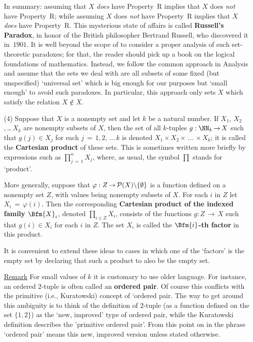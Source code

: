 {    In summary: assuming that $X$ {\em does} have Property~R implies that $X$ does {\em not} have Property~R;
    while assuming $X$ does {\em not} have Property~R implies that $X$ {\em does} have Property~R.
        This mysterious state of affairs is called {\bf Russell's Paradox},
    in honor of the British philosopher Bertrand Russell, who discovered it in~$1901$.
    It is well beyond the scope of {\TheseNotes} to consider a proper analysis of such set-theoretic paradoxes;
    for that, the reader should pick up a book on the logical foundations of mathematics.
    Instead, we follow the common approach in Analysis and assume that the sets we deal with are all subsets of some fixed (but unspecified) `universal set' which is big enough for our purposes but `small enough' to avoid such paradoxes.
    In particular, this approach only sets $X$ which satisfy the relation $X \not \in X$.

\VV


        (4) Suppose that $X$ is a nonempty set and let $k$ be a natural number. If $X_{1}$, $X_{2}$,\,{\ldots}\,$X_{k}$ are nonempty subsets of $X$,
    then the set of all $k$-tuples $g:{\NN}_{k} \,{\rightarrow}\, X$ such that $g(j){\in}X_{j}$ for each $j \,=\, 1,2,\,{\ldots}\,k$ is denoted $X_{1}{\times}X_{2}{\times}\,{\ldots}\,{\times}X_{k}$; it is called the {\bf Cartesian product} of these sets.
    This is sometimes written more briefly by expressions such as ${\prod}_{j \,=\, 1}^{n} X_{j}$, where, as usual, the symbol $\prod$ stands for `product'.

        More generally, suppose that ${\varphi}:Z \,{\rightarrow}\, {\cal P}(X){\setminus}\{{\emptyset}\}$ is a function defined on a nonempty set $Z$, 
    with values being nonempty subsets of $X$.
    For each $i$ in $Z$ let $X_{i} \,=\, {\varphi}(i)$.
    Then the corresponding {\bf Cartesian product of the indexed family $\Bfm{X}_{i}$}, denoted ${\prod}_{i{\in}Z} X_{i}$,
    consists of the functions $g:Z \,{\rightarrow}\, X$ such that $g(i){\in}X_{i}$ for each $i$ in $Z$.
    The set $X_{i}$ is called the {\bf $\Bfm{i}$-th factor} in this product.

        It is convenient to extend these ideas to cases in which one of the `factors' is the empty set by declaring that such a product to also be the empty set.

        \underline{Remark} For small values of $k$ it is customary to use older language.
    For instance, an ordered $2$-tuple is often called an {\bf ordered pair}. Of course this conflicts with the primitive (i.e., Kuratowski) concept of `ordered pair.
    The way to get around this ambiguity is to think of the definition of $2$-tuple (as a function defined on the set $\{1,2\}$) as the `new, improved' type of ordered pair, while the Kuratowski definition describes the 'primitive ordered pair'.
    From this point on in {\TheseNotes} the phrase `ordered pair' means this new, improved version unless stated otherwise.

}
